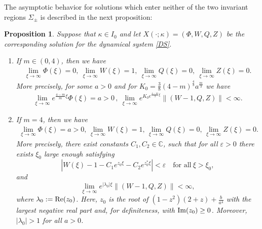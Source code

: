 \documentclass{article}%
\renewcommand{\Re}{{\rm Re}}
\renewcommand{\Im}{{\rm Im}}
\newtheorem{proposition}[theorem]{Proposition}
\begin{document}
The asymptotic behavior for solutions which enter neither of the two 
invariant regions $\Sigma_\pm$ is described in the next proposition:
\begin{proposition} \label{prp-lim2} %
  Suppose that $\kappa\in I_{0}$ and let $X(\cdot;\kappa) = (\Phi,W,Q,Z)$ be the
  corresponding solution for the dynamical system \eqref{DS}. 
\begin{enumerate}
\item If $m \in (0,4)$, then we have
  \begin{align}\label{limit}
    \lim_{\xi \to \infty}\Phi(\xi) = 0,\ \lim_{\xi \to \infty} W(\xi) = 1,\ \lim_{\xi \to \infty} Q(\xi) = 0,  \ 
    \lim_{\xi \to \infty} Z(\xi) =0.
\end{align}
More precisely, for some $a > 0$ and for $K_0=\frac 38(4-m)^{\frac{4}{3}} a^{\frac{m}{3}}$
 we have
\begin{align}\label{asymptotics} %
    \lim_{\xi\to\infty} e^{\frac{4-m}{m}\xi}\Phi(\xi) = a > 0\,,\ \lim_{\xi\to\infty}e^{K_0 e^{\frac{4-m}{3}\xi} }
    \|(W-1, Q, Z)\| <\infty.
\end{align}

\item If $m=4$, then we have
\begin{align}\label{limit4}
    \lim_{\xi \to \infty}\Phi(\xi) = a >0, \, \lim_{\xi \to \infty} W(\xi) = 1, \, \lim_{\xi \to \infty} Q(\xi) = 0, \, 
    \lim_{\xi \to \infty} Z(\xi) =0.
\end{align}
More precisely, there exist constants $C_1, C_2\in \mathbb{C}$, 
such that for all $\varepsilon>0$ there exists $\xi_0$ large enough satisfying
\begin{equation}\label{asymptoticsII} %
  |W(\xi) - 1 - C_1 e^{z_0\xi} -C_2 e^{z_0^*\xi}|<\varepsilon \quad \mbox{for all} \ \xi>\xi_0,
\end{equation} 
and
\begin{equation}\label{asymptotics4}
  \lim_{\xi\to\infty}e^{|\lambda_0| \xi } \|(W-1, Q, Z)\| <\infty,
 \end{equation}
where $\lambda_0:=\Re(z_0)$. Here, $z_0$ is the root of $(1-z^2)(2+z) + \frac{b}{a^4}$
 with the largest negative real part and, for definiteness, with $\Im(z_0)\geq 0$. Moreover, $|\lambda_0|>1$ for all $a>0$.
\end{enumerate}
\end{proposition}
\end{document}
